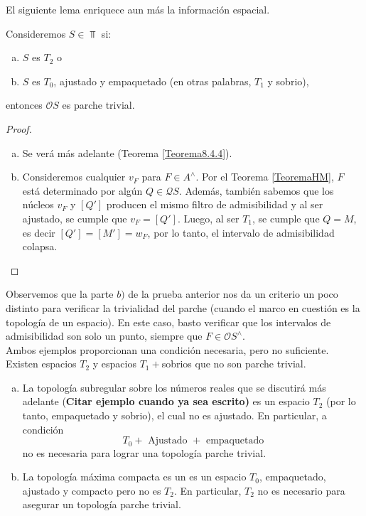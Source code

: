 El siguiente lema enriquece aun más la información espacial.

\begin{lem}\label{Lema8.1.4}
    Consideremos $S\in \Top$ si:
    \begin{enumerate}[a)]
        \item $S$ es $T_2$ o
        \item $S$ es $T_0$, ajustado y empaquetado (en otras palabras, $T_1$ y sobrio),
    \end{enumerate}
    entonces $\mathcal{O}S$ es parche trivial.
\end{lem}

\begin{proof}
    \begin{enumerate}[a)]
        \item Se verá más adelante (Teorema \ref{Teorema8.4.4}).
        \item Consideremos cualquier $v_F$ para $F\in A^\wedge$. Por el Teorema \ref{TeoremaHM}, $F$ está determinado por algún $Q\in \mathcal{Q}S$. Además, también sabemos que los núcleos $v_F$ y $[Q']$ producen el mismo filtro de admisibilidad y al ser ajustado, se cumple que $v_F=[Q']$. Luego, al ser $T_1$, se cumple que $Q=M$, es decir $[Q']=[M']=w_F$, por lo tanto, el intervalo de admisibilidad colapsa.
    \end{enumerate}
\end{proof}

Observemos que la parte $b)$ de la prueba anterior nos da un criterio un poco distinto para verificar la trivialidad del parche (cuando el marco en cuestión es la topología de un espacio). En este caso, basto verificar que los intervalos de admisibilidad son solo un punto, siempre que $F\in \mathcal{O}S^\wedge$. \\

Ambos ejemplos proporcionan una condición necesaria, pero no suficiente. Existen espacios $T_2$ y espacios $T_1+$sobrios que no son parche trivial.



\begin{ej}\label{Ejemplo8.1.5}
    \begin{enumerate}[a)]
        \item La topología subregular sobre los números reales que se discutirá más adelante (\textbf{Citar ejemplo cuando ya sea escrito)} es un espacio $T_2$ (por lo tanto, empaquetado y sobrio), el cual no es ajustado. En particular, a condición
        \[
        T_0+\mbox{ Ajustado }+ \mbox{ empaquetado}
        \]
        no es necesaria para lograr una topología parche trivial.

        \item La topología máxima compacta es un es un espacio $T_0$, empaquetado, ajustado y compacto pero no es $T_2$. En particular, $T_2$ no es necesario para asegurar un topología parche trivial.
    \end{enumerate}
\end{ej}

